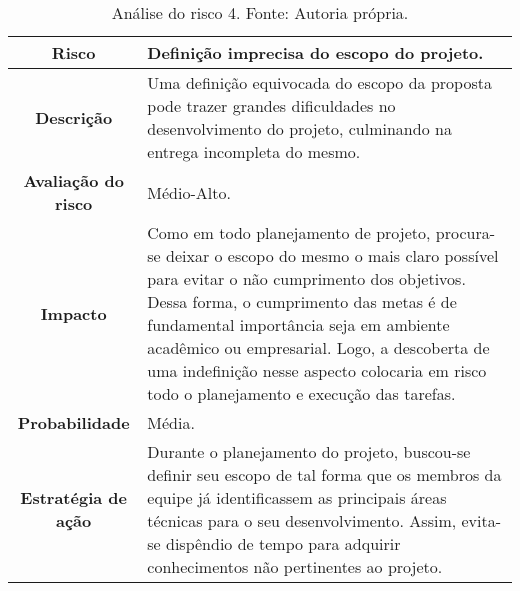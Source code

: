 \begin{table}[h!]
\caption[Análise do risco 4]{Análise do risco 4. Fonte: Autoria própria.}
\begin{center}
\begin{tabular}{|c|p{11cm}|}
\hline
\textbf{Risco} &  Definição imprecisa do escopo do projeto. \\
\hline
\textbf{Descrição} & Uma definição equivocada do escopo da proposta pode trazer grandes dificuldades no desenvolvimento do projeto, culminando na entrega incompleta do mesmo.\\
\hline
\textbf{Avaliação do risco} & Médio-Alto. \\
\hline
\textbf{Impacto} & Como em todo planejamento de projeto, procura-se deixar o escopo do mesmo o mais claro possível para evitar o não cumprimento dos objetivos. Dessa forma, o cumprimento das metas  é de fundamental importância seja em ambiente acadêmico ou empresarial. Logo, a descoberta de uma indefinição nesse aspecto colocaria em risco todo o planejamento e execução das tarefas. \\ 
\hline
\textbf{Probabilidade} & Média.\\
\hline
\textbf{Estratégia de ação} & Durante o planejamento do projeto, buscou-se definir seu escopo de tal forma que os membros da equipe já identificassem as principais áreas técnicas para o seu desenvolvimento. Assim, evita-se dispêndio de tempo para adquirir conhecimentos não pertinentes ao projeto.\\
\hline
\end{tabular}%
\end{center}
\label{tab:risco1}
\end{table}


